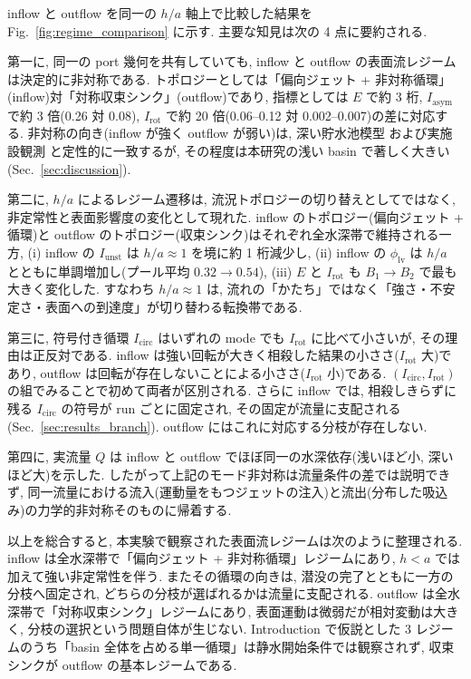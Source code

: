 inflow と outflow を同一の $h/a$ 軸上で比較した結果を Fig.~\ref{fig:regime_comparison} に示す. 主要な知見は次の 4 点に要約される.

第一に, 同一の port 幾何を共有していても, inflow と outflow の表面流レジームは決定的に非対称である. トポロジーとしては「偏向ジェット + 非対称循環」(inflow)対「対称収束シンク」(outflow)であり, 指標としては $E$ で約 3 桁, $I_{\mathrm{asym}}$ で約 3 倍(0.26 対 0.08), $I_{\mathrm{rot}}$ で約 20 倍(0.06--0.12 対 0.002--0.007)の差に対応する. 非対称の向き(inflow が強く outflow が弱い)は, 深い貯水池模型 \cite{mullerInfluenceOutflowSequences2012} および実施設観測 \cite{mullerFlowFieldReservoir2018} と定性的に一致するが, その程度は本研究の浅い basin で著しく大きい(Sec.~\ref{sec:discussion}).

第二に, $h/a$ によるレジーム遷移は, 流況トポロジーの切り替えとしてではなく, 非定常性と表面影響度の変化として現れた. inflow のトポロジー(偏向ジェット + 循環)と outflow のトポロジー(収束シンク)はそれぞれ全水深帯で維持される一方, (i) inflow の $I_{\mathrm{unst}}$ は $h/a \approx 1$ を境に約 1 桁減少し, (ii) inflow の $\phi_{\mathrm{lv}}$ は $h/a$ とともに単調増加し(プール平均 $0.32 \to 0.54$), (iii) $E$ と $I_{\mathrm{rot}}$ も $B_1 \to B_2$ で最も大きく変化した. すなわち $h/a \approx 1$ は, 流れの「かたち」ではなく「強さ・不安定さ・表面への到達度」が切り替わる転換帯である.

第三に, 符号付き循環 $I_{\mathrm{circ}}$ はいずれの mode でも $I_{\mathrm{rot}}$ に比べて小さいが, その理由は正反対である. inflow は強い回転が大きく相殺した結果の小ささ($I_{\mathrm{rot}}$ 大)であり, outflow は回転が存在しないことによる小ささ($I_{\mathrm{rot}}$ 小)である. $(I_{\mathrm{circ}}, I_{\mathrm{rot}})$ の組でみることで初めて両者が区別される. さらに inflow では, 相殺しきらずに残る $I_{\mathrm{circ}}$ の符号が run ごとに固定され, その固定が流量に支配される(Sec.~\ref{sec:results_branch}). outflow にはこれに対応する分枝が存在しない.

第四に, 実流量 $Q$ は inflow と outflow でほぼ同一の水深依存(浅いほど小, 深いほど大)を示した. したがって上記のモード非対称は流量条件の差では説明できず, 同一流量における流入(運動量をもつジェットの注入)と流出(分布した吸込み)の力学的非対称そのものに帰着する.

以上を総合すると, 本実験で観察された表面流レジームは次のように整理される. inflow は全水深帯で「偏向ジェット + 非対称循環」レジームにあり, $h < a$ では加えて強い非定常性を伴う. またその循環の向きは, 潜没の完了とともに一方の分枝へ固定され, どちらの分枝が選ばれるかは流量に支配される. outflow は全水深帯で「対称収束シンク」レジームにあり, 表面運動は微弱だが相対変動は大きく, 分枝の選択という問題自体が生じない. Introduction で仮説とした 3 レジームのうち「basin 全体を占める単一循環」は静水開始条件では観察されず, 収束シンクが outflow の基本レジームである.
